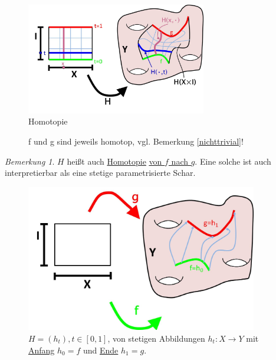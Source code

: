 \documentclass[a4paper,11pt,notitlepage]{report}
\theoremstyle{remark}
\newtheorem{remark}{Bemerkung}[chapter]
\theoremstyle{definition}
\begin{document}
\begin{figure}[h]
\centering
\includegraphics[width=0.7\textwidth]{images/Homotopie.jpg}
\caption{Homotopie}
\end{figure}

\begin{figure}[h]
\centering
{}\qquad
{}
\caption{f und g sind jeweils homotop, vgl. Bemerkung \ref{nichttrivial}!}
\end{figure}

\begin{remark}
$H$ heißt auch \underline{Homotopie} \underline{\underline{von $f$ nach $g$}}. Eine solche ist auch interpretierbar als eine stetige parametrisierte Schar.
\end{remark}

\begin{figure}[h]
\centering
\includegraphics[width=0.9\textwidth]{images/Homotopie_param.jpg}
\caption{$H = (h_t), t \in [0,1]$, von stetigen Abbildungen $h_t \colon X \rightarrow Y$ mit \underline{Anfang} $h_0=f$ und \underline{Ende} $h_1=g$.}
\end{figure}
\end{document}
